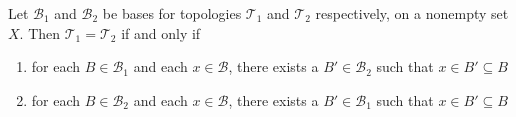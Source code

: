 \begin{prps}
    Let \(\mathcal{B}_1\) and \(\mathcal{B}_2\) be bases for topologies \(\mathcal{T}_1\) and \(\mathcal{T}_2\) respectively, on a nonempty set \(X\). Then \(\mathcal{T}_1 = \mathcal{T}_2\) if and only if
    \begin{enumerate}
        \item for each \(B \in \mathcal{B}_1\) and each \(x \in \mathcal{B}\), there exists a \(B' \in \mathcal{B}_2\) such that \(x \in B' \subseteq B\)
        \item for each \(B \in \mathcal{B}_2\) and each \(x \in \mathcal{B}\), there exists a \(B' \in \mathcal{B}_1\) such that \(x \in B' \subseteq B\)
    \end{enumerate}
\end{prps}